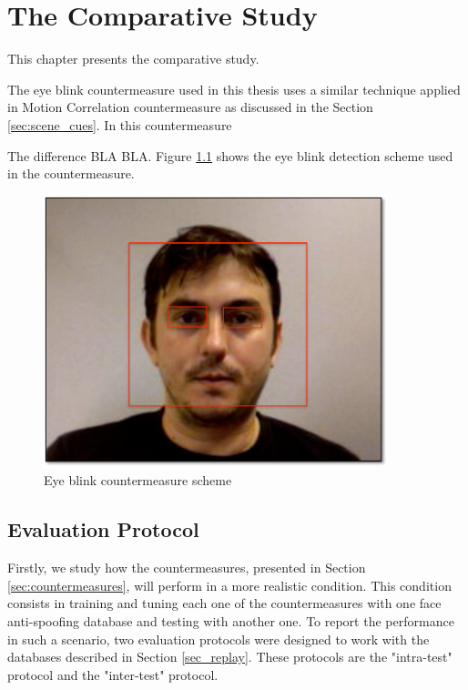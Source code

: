 \chapter{The Comparative Study}
\label{chap:Comparative_Study}

This chapter presents the comparative study.


The eye blink countermeasure used in this thesis uses a similar technique applied in Motion Correlation countermeasure\cite{AnjosIJCB2011} as discussed in the Section \ref{sec:scene_cues}. In this countermeasure 

The difference BLA BLA.
Figure \ref{fig:eye_blink} shows the eye blink detection scheme used in the countermeasure.

\begin{figure}[!btb]
\begin{center}
\includegraphics [width=10cm] {images/eye_blink.pdf}
\caption[Eye blink countermeasure scheme]{Eye blink countermeasure scheme}
\label{fig:eye_blink}
\end{center}
\end{figure}


\section{Evaluation Protocol}
\label{sec:Evaluation_Protocol}

Firstly, we study how the countermeasures, presented in Section \ref{sec:countermeasures}, will perform in a more realistic condition. This condition consists in training and tuning each one of the countermeasures with one face anti-spoofing database and testing with another one. To report the performance in such a scenario, two evaluation protocols were designed to work with the databases described in Section \ref{sec_replay}. These protocols are the "intra-test" protocol and the "inter-test" protocol.


